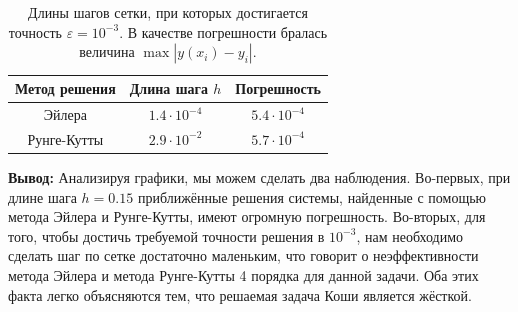 \documentclass[12pt]{article}%
\begin{document}
\newpage
\begin{table}[!h]
    \centering
    \begin{tabular}{|c|c|c|}
    \hline Метод решения & Длина шага $h$ & Погрешность \\
    \hline Эйлера & $1.4 \cdot 10^{-4}$ & $5.4 \cdot 10^{-4}$ \\
    \hline Рунге-Кутты & $2.9 \cdot 10^{-2}$ & $5.7 \cdot 10^{-4}$ \\
    \hline
    \end{tabular}
    \caption{Длины шагов сетки, при которых достигается точность $\varepsilon = 10^{-3}$. В качестве погрешности бралась величина $\max\limits|y(x_i) - y_i|$.}
\end{table}

\textbf{Вывод:} Анализируя графики, мы можем сделать два наблюдения.
Во-первых, при длине шага $h=0.15$ приближённые решения системы, найденные с помощью метода Эйлера и Рунге-Кутты, имеют огромную погрешность. Во-вторых, для того, чтобы достичь требуемой точности решения в $10^{-3}$, нам необходимо сделать шаг по сетке достаточно маленьким, что говорит о неэффективности метода Эйлера и метода Рунге-Кутты 4 порядка для данной задачи. Оба этих факта легко объясняются тем, что решаемая задача Коши является жёсткой.
\end{document}
